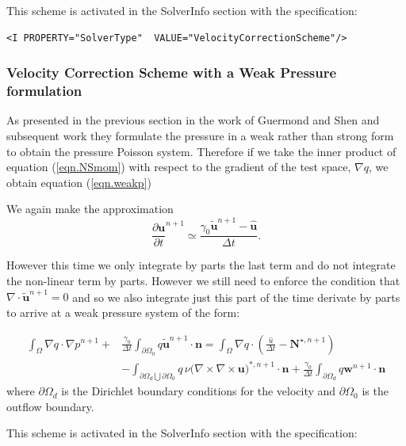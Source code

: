 This scheme is activated in the SolverInfo section with the
 specification:

\begin{lstlisting}[style=XMLStyle]
 <I PROPERTY="SolverType"  VALUE="VelocityCorrectionScheme"/>
\end{lstlisting}


\subsubsection{Velocity Correction Scheme with a Weak Pressure formulation}

As presented in the previous section in the work of Guermond and Shen
\cite{GuSh03} and subsequent work they formulate the pressure in a
weak rather than strong form to obtain the pressure Poisson
system. Therefore if we take the inner product of equation
(\ref{eqn.NSmom}) with respect to the gradient of the test space,
$\nabla q$, we obtain equation (\ref{eqn.weakp})

We again make the approximation 
\begin{equation}
  \frac{\partial \mathbf{u}}{\partial t}^{n+1} \simeq \frac{\gamma_0 \tilde{\mathbf{u}}^{n+1} - \hat{\mathbf{u}}}{\Delta t}.
\end{equation}

However this time we only integrate by parts the last term and do not
integrate the non-linear term by parts. However we still need to
enforce the condition that $\nabla \cdot \tilde{\mathbf{u}}^{n+1} = 0
$ and so we also integrate just this part of the time derivate by
parts to arrive at a weak pressure system of the form:

\begin{align}
  \int_{\Omega} \nabla q \cdot \nabla p^{n+1} +& \frac{\gamma_0}{\Delta t} \int_{\partial \Omega_0} q { \tilde{\mathbf{u}}}^{n+1} \cdot \mathbf{n}  = 
  \int_{\Omega} \nabla q \cdot (\frac{\hat{u}}{\Delta t}
   - {\mathbf{N}}^{\star,n+1})  \nonumber \\
  & - \int_{\partial \Omega_d \bigcup \partial \Omega_0} q\, \nu (\nabla \times \nabla \times {\mathbf{u})}^{*,n+1} \cdot \mathbf{n} + \frac{\gamma_0}{\Delta t} \int_{\partial \Omega_d} q {\mathbf{w}}^{n+1} \cdot \mathbf{n}
\end{align}
where $\partial \Omega_d$ is the Dirichlet boundary conditions for the velocity and $\partial \Omega_0$ is the outflow boundary. 

This scheme is activated in the SolverInfo section with the
 specification:

